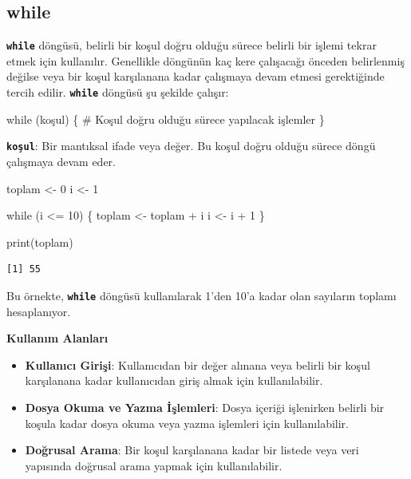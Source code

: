 \documentclass[
  letterpaper,
  DIV=11,
  numbers=noendperiod]{scrreprt}
\newenvironment{Shaded}{\begin{snugshade}}{\end{snugshade}}
\newcommand{\CommentTok}[1]{\textcolor[rgb]{0.37,0.37,0.37}{#1}}
\newcommand{\ControlFlowTok}[1]{\textcolor[rgb]{0.00,0.23,0.31}{#1}}
\newcommand{\DecValTok}[1]{\textcolor[rgb]{0.68,0.00,0.00}{#1}}
\newcommand{\FunctionTok}[1]{\textcolor[rgb]{0.28,0.35,0.67}{#1}}
\newcommand{\NormalTok}[1]{\textcolor[rgb]{0.00,0.23,0.31}{#1}}
\newcommand{\OtherTok}[1]{\textcolor[rgb]{0.00,0.23,0.31}{#1}}
\newcommand{\SpecialCharTok}[1]{\textcolor[rgb]{0.37,0.37,0.37}{#1}}
\begin{document}
\subsection{while}\label{while}

\textbf{\texttt{while}} döngüsü, belirli bir koşul doğru olduğu sürece
belirli bir işlemi tekrar etmek için kullanılır. Genellikle döngünün kaç
kere çalışacağı önceden belirlenmiş değilse veya bir koşul karşılanana
kadar çalışmaya devam etmesi gerektiğinde tercih edilir.
\textbf{\texttt{while}} döngüsü şu şekilde çalışır:

\begin{Shaded}
\begin{Highlighting}[]
\ControlFlowTok{while}\NormalTok{ (koşul) \{}
  \CommentTok{\# Koşul doğru olduğu sürece yapılacak işlemler}
\NormalTok{\}}
\end{Highlighting}
\end{Shaded}

\textbf{\texttt{koşul}}: Bir mantıksal ifade veya değer. Bu koşul doğru
olduğu sürece döngü çalışmaya devam eder.

\begin{Shaded}
\begin{Highlighting}[]
\NormalTok{toplam }\OtherTok{\textless{}{-}} \DecValTok{0}
\NormalTok{i }\OtherTok{\textless{}{-}} \DecValTok{1}

\ControlFlowTok{while}\NormalTok{ (i }\SpecialCharTok{\textless{}=} \DecValTok{10}\NormalTok{) \{}
\NormalTok{  toplam }\OtherTok{\textless{}{-}}\NormalTok{ toplam }\SpecialCharTok{+}\NormalTok{ i}
\NormalTok{  i }\OtherTok{\textless{}{-}}\NormalTok{ i }\SpecialCharTok{+} \DecValTok{1}
\NormalTok{\}}

\FunctionTok{print}\NormalTok{(toplam)}
\end{Highlighting}
\end{Shaded}

\begin{verbatim}
[1] 55
\end{verbatim}

Bu örnekte, \textbf{\texttt{while}} döngüsü kullanılarak 1'den 10'a
kadar olan sayıların toplamı hesaplanıyor.

\textbf{Kullanım Alanları}

\begin{itemize}
\item
  \textbf{Kullanıcı Girişi}: Kullanıcıdan bir değer alınana veya belirli
  bir koşul karşılanana kadar kullanıcıdan giriş almak için
  kullanılabilir.
\item
  \textbf{Dosya Okuma ve Yazma İşlemleri}: Dosya içeriği işlenirken
  belirli bir koşula kadar dosya okuma veya yazma işlemleri için
  kullanılabilir.
\item
  \textbf{Doğrusal Arama}: Bir koşul karşılanana kadar bir listede veya
  veri yapısında doğrusal arama yapmak için kullanılabilir.
\end{itemize}
\end{document}
